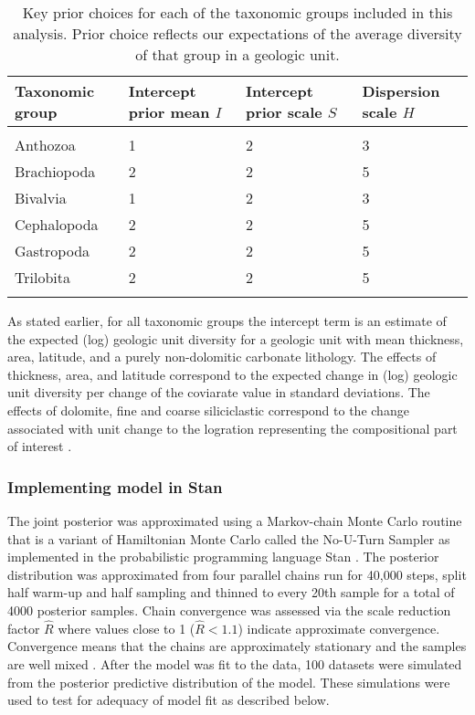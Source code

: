 \documentclass[12pt,letterpaper]{article}
\begin{document}
\begin{table}
  \centering
  \begin{tabular}{ l l l l }
    Taxonomic group & Intercept prior mean \(I\) & Intercept prior scale \(S\) & Dispersion scale \(H\) \\
    \hline \\
    Anthozoa & 1 & 2 & 3 \\
    Brachiopoda & 2 & 2 & 5 \\
    Bivalvia & 1 & 2 & 3 \\
    Cephalopoda & 2 & 2 & 5 \\
    Gastropoda & 2 & 2 & 5 \\
    Trilobita & 2 & 2 & 5 \\
    \hline \\
  \end{tabular}
  \caption{Key prior choices for each of the taxonomic groups included in this analysis. Prior choice reflects our expectations of the average diversity of that group in a geologic unit.}
  \label{tab:prior}
\end{table}

As stated earlier, for all taxonomic groups the intercept term is an estimate of the expected (log) geologic unit diversity for a geologic unit with mean thickness, area, latitude, and a purely non-dolomitic carbonate lithology. The effects of thickness, area, and latitude correspond to the expected change in (log) geologic unit diversity per change of the coviarate value in standard deviations. The effects of dolomite, fine and coarse siliciclastic correspond to the change associated with unit change to the logration representing the compositional part of interest \citep{Hron2012}.

\subsubsection{Implementing model in Stan}

The joint posterior was approximated using a Markov-chain Monte Carlo routine that is a variant of Hamiltonian Monte Carlo called the No-U-Turn Sampler \citep{Hoffman2014} as implemented in the probabilistic programming language Stan \citep{2014stan}. The posterior distribution was approximated from four parallel chains run for 40,000 steps, split half warm-up and half sampling and thinned to every 20th sample for a total of 4000 posterior samples. Chain convergence was assessed via the scale reduction factor \(\hat{R}\) where values close to 1 (\(\hat{R} < 1.1\)) indicate approximate convergence. Convergence means that the chains are approximately stationary and the samples are well mixed \citep{Gelman2013d}. After the model was fit to the data, 100 datasets were simulated from the posterior predictive distribution of the model. These simulations were used to test for adequacy of model fit as described below.
\end{document}
